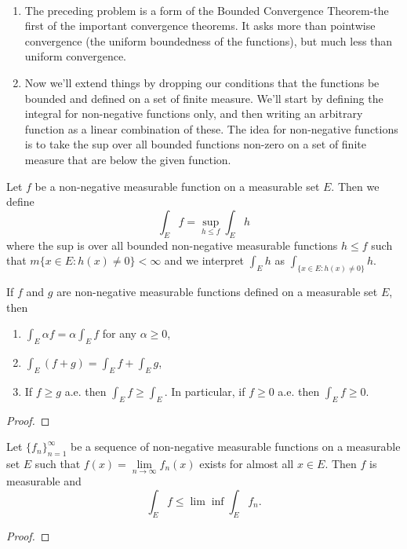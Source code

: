 \begin{rmk}~ %
\begin{enumerate}
	\item The preceding problem is a form of the Bounded Convergence Theorem-the first of 
	the important convergence theorems. It asks more than pointwise convergence (the 
	uniform boundedness of the functions), but much less than uniform convergence. 
	\item Now we'll extend things by dropping our conditions that the functions be bounded 
	and defined on a set of finite measure. We'll start by defining the integral for non-negative 
	functions only, and then writing an arbitrary function as a linear combination of these. The 
	idea for non-negative functions is to take the sup over all bounded functions non-zero on a set 
	of finite measure that are below the given function.
\end{enumerate}
\end{rmk}

\begin{defn}\label{d:thehundred}%
	Let $f$ be a non-negative measurable function on a measurable set $E$. Then we define 
	\begin{equation*}
		\int_E f = \sup\limits_{h\le f}\int_E h
	\end{equation*}
	where the sup is over all bounded non-negative measurable functions $h \le f$ such that 
	$m\{x \in E: h(x) \neq 0\} < \infty$ and we interpret $\int_E h$ as 
	$\int_{\{x\in E:h(x)\neq0\}}h$. 
\end{defn}

\begin{pblm}\label{p:conditionsnonnegmeasu}%
	If $f$ and $g$ are non-negative measurable functions defined on a measurable set $E$, then 
	\begin{enumerate}
		\item $\int_E \alpha f = \alpha \int_E f$ for any $\alpha \ge 0$, 
		\item $\int_E(f+g) = \int_E f + \int_E g$, 
		\item If $f \ge g$ a.e. then $\int_E f \ge \int_E$. In particular, if 
		$f \ge 0$ a.e. then $\int_E f \ge 0$. 
	\end{enumerate}
\begin{proof}
\end{proof}
\end{pblm}

\begin{pblm}\label{p:inteqliminf}%
	Let $\{f_n\}_{n=1}^\infty$ be a sequence of non-negative measurable functions on a 
	measurable set $E$ such that $f(x) = \lim\limits_{n\to\infty}f_n(x)$ exists for almost 
	all $x \in E$. Then $f$ is measurable and 
	\begin{equation*}
		\int_E f \le \lim\inf\int_E f_n.
	\end{equation*}
\begin{proof}
\end{proof}
\end{pblm}

